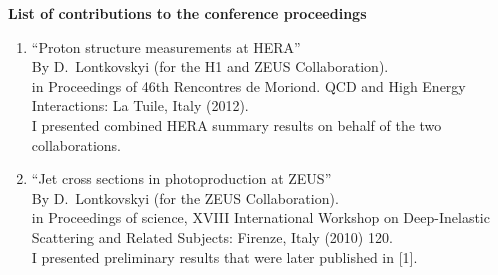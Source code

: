 \begin{flushleft}
\textbf{List of contributions to the conference proceedings}\\
\end{flushleft}
\begin{enumerate}
	\item ``Proton structure measurements at HERA''\\
	By D.~Lontkovskyi (for the H1 and ZEUS Collaboration).\\
	in Proceedings of 46th Rencontres de Moriond. QCD and High Energy Interactions: La Tuile, Italy (2012).\\
	I presented combined HERA summary results on behalf of the two collaborations.

	\item ``Jet cross sections in photoproduction at ZEUS''\\
	By D.~Lontkovskyi (for the ZEUS Collaboration).\\
	in Proceedings of science, XVIII International Workshop on Deep-Inelastic Scattering and Related Subjects: Firenze, Italy (2010) 120.\\
	I presented preliminary results that were later published in [1].
\end{enumerate}
